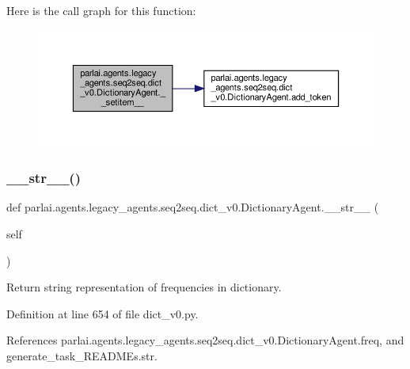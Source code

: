 Here is the call graph for this function\+:
\nopagebreak
\begin{figure}[H]
\begin{center}
\leavevmode
\includegraphics[width=350pt]{classparlai_1_1agents_1_1legacy__agents_1_1seq2seq_1_1dict__v0_1_1DictionaryAgent_af234fbce75cd277f03b20688f7ba0e52_cgraph}
\end{center}
\end{figure}
\mbox{\label{classparlai_1_1agents_1_1legacy__agents_1_1seq2seq_1_1dict__v0_1_1DictionaryAgent_ae380876d4ad2c7292e8610985ff2184d}} 
\subsubsection{\texorpdfstring{\+\_\+\+\_\+str\+\_\+\+\_\+()}{\_\_str\_\_()}}
{\footnotesize\ttfamily def parlai.\+agents.\+legacy\+\_\+agents.\+seq2seq.\+dict\+\_\+v0.\+Dictionary\+Agent.\+\_\+\+\_\+str\+\_\+\+\_\+ (\begin{DoxyParamCaption}\item[{}]{self }\end{DoxyParamCaption})}

\begin{DoxyVerb}Return string representation of frequencies in dictionary.\end{DoxyVerb}
 

Definition at line 654 of file dict\+\_\+v0.\+py.



References parlai.\+agents.\+legacy\+\_\+agents.\+seq2seq.\+dict\+\_\+v0.\+Dictionary\+Agent.\+freq, and generate\+\_\+task\+\_\+\+R\+E\+A\+D\+M\+Es.\+str.

